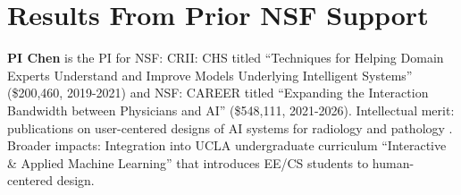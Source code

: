 \section{Results From Prior NSF Support}
{\bf PI Chen} is the PI for NSF: CRII: CHS titled “Techniques for Helping Domain Experts Understand and Improve Models Underlying Intelligent Systems” (\$200,460, 2019-2021) and NSF: CAREER titled “Expanding the Interaction Bandwidth between Physicians and AI” (\$548,111, 2021-2026). Intellectual merit: publications on user-centered designs of AI systems for radiology \cite{xie2020chexplain} and pathology \cite{gu2021lessons,gu2023improving,gu2023augmenting}. Broader impacts: Integration into UCLA undergraduate curriculum “Interactive \& Applied Machine Learning” that introduces EE/CS students to human-centered design.